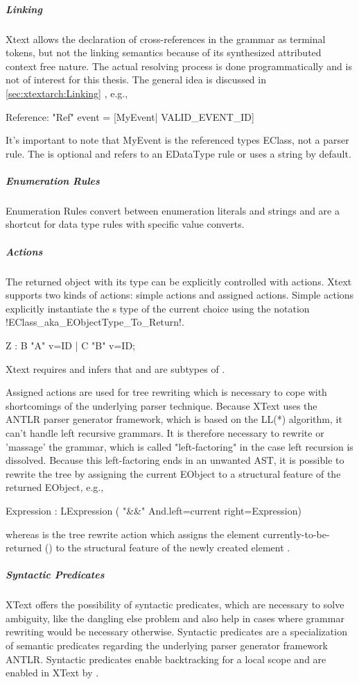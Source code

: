 \subparagraph{Linking}
Xtext allows the declaration of cross-references in the grammar as terminal tokens, but not the linking semantics because of its synthesized attributed context free nature. The actual resolving process is done programmatically and is not of interest for this thesis. The general idea is discussed in \ref{sec:xtextarch:Linking} ,
e.g., 
\begin{xtxt}
Reference:  "Ref" event = [MyEvent| VALID_EVENT_ID]
\end{xtxt}
It's important to note that MyEvent is the referenced types EClass, not a parser rule. The  is optional and refers to an EDataType rule or uses a string by default.

\subparagraph{Enumeration Rules}
Enumeration Rules convert between enumeration literals and strings and are a shortcut for data type rules with specific value converts.

\subparagraph{Actions}
The returned object with its type can be explicitly controlled with actions. Xtext supports two kinds of actions: simple actions and assigned actions. Simple actions explicitly instantiate the s type of the current choice using the notation \kode!{EClass_aka_EObjectType_To_Return}!.
\begin{xtxt}
Z 	: 	{B} "A" v=ID
	| 	{C} "B" v=ID;
\end{xtxt}
Xtext requires and infers that  and  are subtypes of . 

Assigned actions are used for tree rewriting which is necessary to cope with shortcomings of the underlying parser technique. Because XText uses the ANTLR parser generator framework, which is based on the LL(*) algorithm, it can't handle left recursive grammars. It is therefore necessary to rewrite or 'massage' the grammar, which is called "left-factoring" in the case left recursion is dissolved. Because this left-factoring ends in an unwanted AST, it is possible to rewrite the tree by assigning the current EObject to a structural feature of the returned EObject, e.g., 
\begin{xtxt}
Expression 	: 	LExpression 
	 	( "&&" {And.left=current}  right=Expression)
\end{xtxt}
whereas  is the tree rewrite action which assigns the element currently-to-be-returned () to the structural feature  of the newly created element .


\subparagraph{Syntactic Predicates}
XText offers the possibility of syntactic predicates, which are necessary to solve ambiguity, like the dangling else  problem and also help in cases where grammar rewriting would be necessary otherwise. Syntactic predicates are a specialization of semantic predicates regarding the underlying parser generator framework ANTLR. Syntactic predicates enable backtracking for a local scope and are enabled in XText by \code{=>}.



